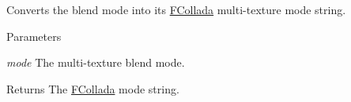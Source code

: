 \label{namespaceFUDaeBlendMode_aa7d24e4deca0de79cf755d1e62775d00}
Converts the blend mode into its \hyperlink{namespaceFCollada}{FCollada} multi-\/texture mode string. 
\begin{DoxyParams}{Parameters}
\item[{\em mode}]The multi-\/texture blend mode. \end{DoxyParams}
\begin{DoxyReturn}{Returns}
The \hyperlink{namespaceFCollada}{FCollada} mode string. 
\end{DoxyReturn}
